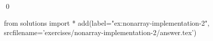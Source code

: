 
\begin{ex} 
  \label{ex:nonarray-implementation-2}
  
  \qed
\end{ex} 
\begin{python0}
from solutions import *
add(label="ex:nonarray-implementation-2",
    srcfilename='exercises/nonarray-implementation-2/answer.tex') 
\end{python0}

